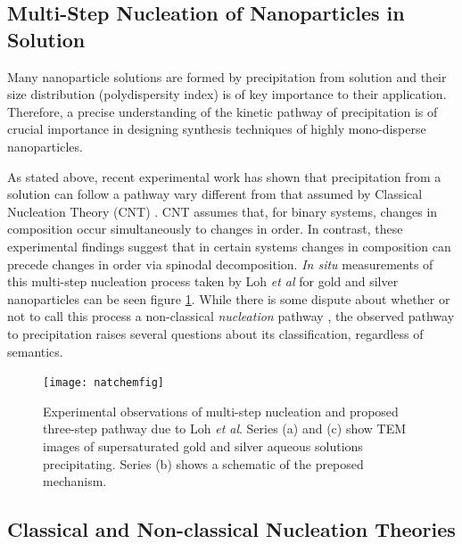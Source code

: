 \documentclass[showkeys, prb, reprint]{revtex4-1}
\begin{document}
\subsection{Multi-Step Nucleation of Nanoparticles in Solution} %


Many nanoparticle solutions are formed by precipitation from solution and their
size distribution (polydispersity index) is of key importance to their
application. Therefore, a precise understanding of the kinetic pathway of
precipitation is of crucial importance in designing synthesis techniques of
highly mono-disperse nanoparticles.

As stated above, recent experimental work has shown that precipitation from a
solution can follow a pathway vary different from that assumed by Classical
Nucleation Theory (CNT) \cite{LOH17, WALLACE13}. CNT assumes that, for binary
systems, changes in composition occur simultaneously to changes in order. In
contrast, these experimental findings suggest that in certain systems changes
in composition can precede changes in order via spinodal decomposition.
\textit{In situ} measurements of this multi-step nucleation process taken by
Loh \textit{et al}\cite{LOH17} for gold and silver nanoparticles can be seen
figure \ref{loh_figure}. While there is some dispute about whether or not to
call this process a non-classical \textit{nucleation} pathway \cite{DAVEY13,
GEBAUER11}, the observed pathway to precipitation raises several questions
about its classification, regardless of semantics.

\begin{figure}
    \texttt{[image: natchemfig]}
    \caption{
        \label{loh_figure} 
        Experimental observations of multi-step nucleation and proposed
        three-step pathway due to Loh \textit{et al}\cite{LOH17}. Series (a)
        and (c) show TEM images of supersaturated gold and silver aqueous
        solutions precipitating.  Series (b) shows a schematic of the preposed
        mechanism.
    }
\end{figure}



\subsection{Classical and Non-classical Nucleation Theories} %
\end{document}

